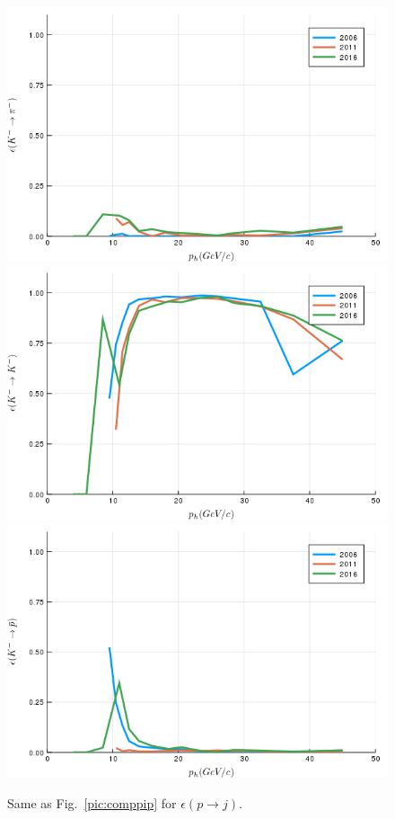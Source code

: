 \begin{figure}[!p]
  \centering
	\includegraphics[scale=0.35]{./gfx/t1/km2pim.png}
  \includegraphics[scale=0.35]{./gfx/t1/km2km.png}
  \includegraphics[scale=0.35]{./gfx/t1/km2pm.png}
	\caption{Same as Fig.~\ref{pic:comppip} for $\epsilon(p \rightarrow j)$.}
	\label{pic:compkm}
\end{figure}

